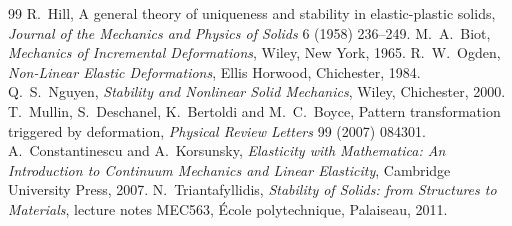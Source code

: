 \label{sec:so-exo}

\begin{chapterbib}{99}
 R.~Hill, A general theory of uniqueness and stability in elastic-plastic solids, \emph{Journal of the Mechanics and Physics of Solids} 6 (1958) 236--249.
 M.~A.~Biot, \emph{Mechanics of Incremental Deformations}, Wiley, New York, 1965.
 R.~W.~Ogden, \emph{Non-Linear Elastic Deformations}, Ellis Horwood, Chichester, 1984.
 Q.~S.~Nguyen, \emph{Stability and Nonlinear Solid Mechanics}, Wiley, Chichester, 2000.
 T.~Mullin, S.~Deschanel, K.~Bertoldi and M.~C.~Boyce, Pattern transformation triggered by deformation, \emph{Physical Review Letters} 99 (2007) 084301.
 A.~Constantinescu and A.~Korsunsky, \emph{Elasticity with Mathematica: An Introduction to Continuum Mechanics and Linear Elasticity}, Cambridge University Press, 2007.
 N.~Triantafyllidis, \emph{Stability of Solids: from Structures to Materials}, lecture notes MEC563, \'Ecole polytechnique, Palaiseau, 2011.
\end{chapterbib}
